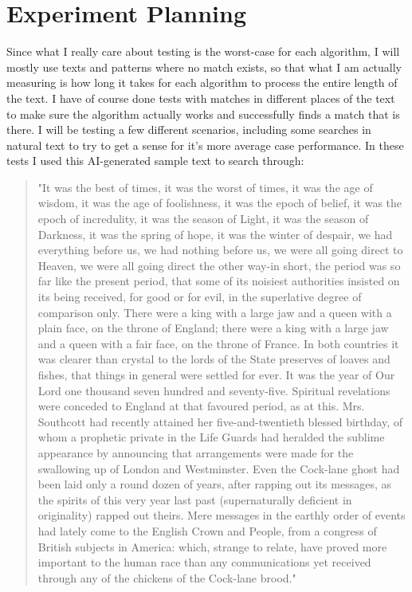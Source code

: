 \documentclass[12pt,a4paper]{article}
\begin{document}
\section{Experiment Planning}

Since what I really care about testing is the worst-case for each algorithm, I will mostly use texts and patterns where no match exists, so that what I am actually measuring is how long it takes for each algorithm to process the entire length of the text.
I have of course done tests with matches in different places of the text to make sure the algorithm actually works and successfully finds a match that is there.
I will be testing a few different scenarios, including some searches in natural text to try to get a sense for it's more average case performance. In these tests I used this AI-generated sample text to search through:

\begin{quotation}
"It was the best of times, it was the worst of times, it was the age of wisdom, it was the age of foolishness, it was the epoch of belief, it was the epoch of incredulity, it was the season of Light, it was the season of Darkness, it was the spring of hope, it was the winter of despair, we had everything before us, we had nothing before us, we were all going direct to Heaven, we were all going direct the other way-in short, the period was so far like the present period, that some of its noisiest authorities insisted on its being received, for good or for evil, in the superlative degree of comparison only. There were a king with a large jaw and a queen with a plain face, on the throne of England; there were a king with a large jaw and a queen with a fair face, on the throne of France. In both countries it was clearer than crystal to the lords of the State preserves of loaves and fishes, that things in general were settled for ever. It was the year of Our Lord one thousand seven hundred and seventy-five. Spiritual revelations were conceded to England at that favoured period, as at this. Mrs. Southcott had recently attained her five-and-twentieth blessed birthday, of whom a prophetic private in the Life Guards had heralded the sublime appearance by announcing that arrangements were made for the swallowing up of London and Westminster. Even the Cock-lane ghost had been laid only a round dozen of years, after rapping out its messages, as the spirits of this very year last past (supernaturally deficient in originality) rapped out theirs. Mere messages in the earthly order of events had lately come to the English Crown and People, from a congress of British subjects in America: which, strange to relate, have proved more important to the human race than any communications yet received through any of the chickens of the Cock-lane brood."
\end{quotation}
\end{document}
